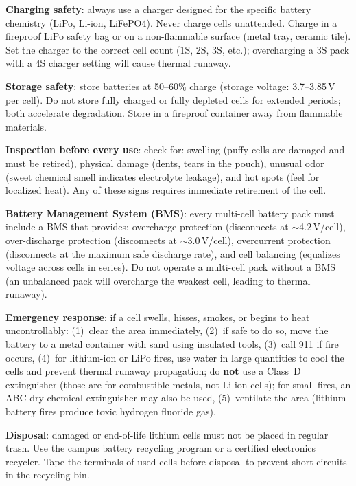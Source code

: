 \textbf{Charging safety}: always use a charger designed for the specific battery chemistry (LiPo, Li-ion, LiFePO4). Never charge cells unattended. Charge in a fireproof LiPo safety bag or on a non-flammable surface (metal tray, ceramic tile). Set the charger to the correct cell count (1S, 2S, 3S, etc.); overcharging a 3S pack with a 4S charger setting will cause thermal runaway.

\textbf{Storage safety}: store batteries at 50--60\% charge (storage voltage: 3.7--3.85\,V per cell). Do not store fully charged or fully depleted cells for extended periods; both accelerate degradation. Store in a fireproof container away from flammable materials.

\textbf{Inspection before every use}: check for: swelling (puffy cells are damaged and must be retired), physical damage (dents, tears in the pouch), unusual odor (sweet chemical smell indicates electrolyte leakage), and hot spots (feel for localized heat). Any of these signs requires immediate retirement of the cell.

\textbf{Battery Management System (BMS)}: every multi-cell battery pack must include a BMS that provides: overcharge protection (disconnects at $\sim$4.2\,V/cell), over-discharge protection (disconnects at $\sim$3.0\,V/cell), overcurrent protection (disconnects at the maximum safe discharge rate), and cell balancing (equalizes voltage across cells in series). Do not operate a multi-cell pack without a BMS (an unbalanced pack will overcharge the weakest cell, leading to thermal runaway).

\textbf{Emergency response}: if a cell swells, hisses, smokes, or begins to heat uncontrollably: (1)~clear the area immediately, (2)~if safe to do so, move the battery to a metal container with sand using insulated tools, (3)~call 911 if fire occurs, (4)~for lithium-ion or LiPo fires, use water in large quantities to cool the cells and prevent thermal runaway propagation; do \textbf{not} use a Class~D extinguisher (those are for combustible metals, not Li-ion cells); for small fires, an ABC dry chemical extinguisher may also be used, (5)~ventilate the area (lithium battery fires produce toxic hydrogen fluoride gas).

\textbf{Disposal}: damaged or end-of-life lithium cells must not be placed in regular trash. Use the campus battery recycling program or a certified electronics recycler. Tape the terminals of used cells before disposal to prevent short circuits in the recycling bin.



